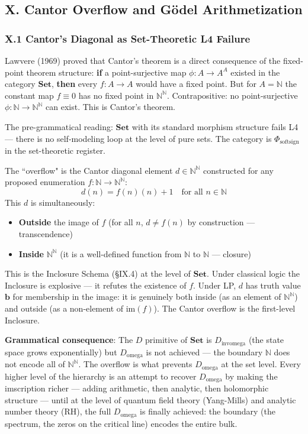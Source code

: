 \documentclass[12pt,a4paper]{article}
\newcommand{\pilcrow}{\S}
\begin{document}
\subsection{X. Cantor Overflow and G\"odel Arithmetization}
\subsubsection{X.1 Cantor's Diagonal as Set-Theoretic L4 Failure}
Lawvere (1969) proved that Cantor's theorem is a direct consequence of the fixed-point theorem structure: \textbf{if} a point-surjective map $\phi: A \to A^A$ existed in the category $\mathbf{Set}$, \textbf{then} every $f: A \to A$ would have a fixed point. But for $A = \mathbb{N}$ the constant map $f \equiv 0$ has no fixed point in $\mathbb{N}^{\mathbb{N}}$. Contrapositive: no point-surjective $\phi: \mathbb{N} \to \mathbb{N}^{\mathbb{N}}$ can exist. This is Cantor's theorem.

The pre-grammatical reading: $\mathbf{Set}$ with its standard morphism structure fails L4 --- there is no self-modeling loop at the level of pure sets. The category is $\Phi_{\text{softsign}}$ in the set-theoretic register.

The ``overflow" is the Cantor diagonal element $d \in \mathbb{N}^{\mathbb{N}}$ constructed for any proposed enumeration $f: \mathbb{N} \to \mathbb{N}^{\mathbb{N}}$:
\[d(n) = f(n)(n) + 1 \quad \text{for all } n \in \mathbb{N}\]
This $d$ is simultaneously:
\begin{itemize}
\item \textbf{Outside} the image of $f$ (for all $n$, $d \neq f(n)$ by construction --- transcendence)
\item \textbf{Inside} $\mathbb{N}^{\mathbb{N}}$ (it is a well-defined function from $\mathbb{N}$ to $\mathbb{N}$ --- closure)
\end{itemize}
This is the Inclosure Schema (\pilcrow{}IX.4) at the level of $\mathbf{Set}$. Under classical logic the Inclosure is explosive --- it refutes the existence of $f$. Under LP, $d$ has truth value $\mathbf{b}$ for membership in the image: it is genuinely both inside (as an element of $\mathbb{N}^{\mathbb{N}}$) and outside (as a non-element of $\text{im}(f)$). The Cantor overflow is the first-level Inclosure.

\textbf{Grammatical consequence}: The $D$ primitive of $\mathbf{Set}$ is $D_{\text{invomega}}$ (the state space grows exponentially) but $D_{\text{omega}}$ is not achieved --- the boundary $\mathbb{N}$ does not encode all of $\mathbb{N}^{\mathbb{N}}$. The overflow is what prevents $D_{\text{omega}}$ at the set level. Every higher level of the hierarchy is an attempt to recover $D_{\text{omega}}$ by making the imscription richer --- adding arithmetic, then analytic, then holomorphic structure --- until at the level of quantum field theory (Yang-Mills) and analytic number theory (RH), the full $D_{\text{omega}}$ is finally achieved: the boundary (the spectrum, the zeros on the critical line) encodes the entire bulk.
\end{document}
